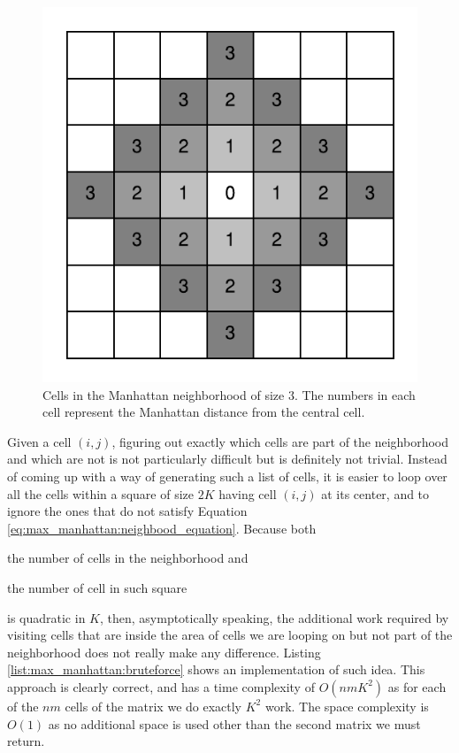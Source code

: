 \begin{figure}
	\centering
	\includegraphics[width=\textwidth]{sources/max_manhattan/images/neighborhood}
	\caption[Cells in the Manhattan neighborhood of size $3$.]{Cells in the Manhattan neighborhood of size $3$. 
	The numbers in each cell represent the Manhattan distance from the central cell.}
	\label{fig:max_manhattan:neighborhood}
\end{figure}
Given a cell $(i,j)$, figuring out exactly which cells are part of the neighborhood and which are not
is not particularly difficult but is definitely not trivial. 
Instead of coming up with a way of generating such a list of cells, it is easier to loop over all the cells within
a square of size $2K$ having cell $(i,j)$ at its center, and to ignore the ones that do not satisfy Equation \ref{eq:max_manhattan:neighbood_equation}.
Because both 
\begin{enumerate*}
	\item the number of cells in the neighborhood and 
	\item the number of cell in such square
\end{enumerate*} is quadratic in $K$, 
then, asymptotically speaking, the additional work required by visiting cells that are inside the area of cells we are looping on but not part of the neighborhood
does not really make any difference. 
Listing \ref{list:max_manhattan:bruteforce} shows an implementation of such idea. 
This approach is clearly correct, and has a time complexity of $O(nmK^2)$ as for each of the $nm$ cells of the matrix we do exactly $K^2$ work.
The space complexity is $O(1)$ as no additional space is used other than the second matrix we must return.



